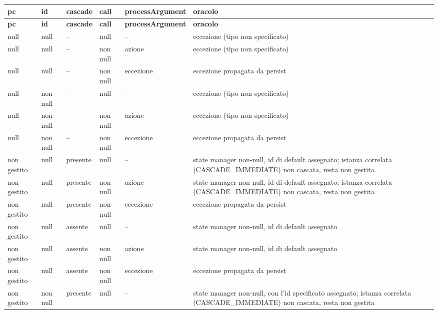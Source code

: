 {\footnotesize\setlength{\tabcolsep}{3pt}
\begin{longtable}{>{\raggedright\arraybackslash}p{}>{\raggedright\arraybackslash}p{}>{\raggedright\arraybackslash}p{}>{\raggedright\arraybackslash}p{}>{\raggedright\arraybackslash}p{}>{\raggedright\arraybackslash}p{}}
\toprule
\textbf{pc} & \textbf{id} & \textbf{cascade} & \textbf{call} & \textbf{processArgument} & \textbf{oracolo} \\
\midrule
\endfirsthead
\toprule
\textbf{pc} & \textbf{id} & \textbf{cascade} & \textbf{call} & \textbf{processArgument} & \textbf{oracolo} \\
\midrule
\endhead
\bottomrule
\endfoot
null & null & -- & null & -- & eccezione (tipo non specificato) \\
null & null & -- & non null & azione & eccezione (tipo non specificato) \\
null & null & -- & non null & eccezione & eccezione propagata da persist \\
null & non null & -- & null & -- & eccezione (tipo non specificato) \\
null & non null & -- & non null & azione & eccezione (tipo non specificato) \\
null & non null & -- & non null & eccezione & eccezione propagata da persist \\
non gestito & null & presente & null & -- & state manager non-null, id di default assegnato; istanza correlata (CASCADE\_IMMEDIATE) non cascata, resta non gestita \\
non gestito & null & presente & non null & azione & state manager non-null, id di default assegnato; istanza correlata (CASCADE\_IMMEDIATE) non cascata, resta non gestita \\
non gestito & null & presente & non null & eccezione & eccezione propagata da persist \\
non gestito & null & assente & null & -- & state manager non-null, id di default assegnato \\
non gestito & null & assente & non null & azione & state manager non-null, id di default assegnato \\
non gestito & null & assente & non null & eccezione & eccezione propagata da persist \\
non gestito & non null & presente & null & -- & state manager non-null, con l'id specificato assegnato; istanza correlata (CASCADE\_IMMEDIATE) non cascata, resta non gestita \\

\end{longtable}}
